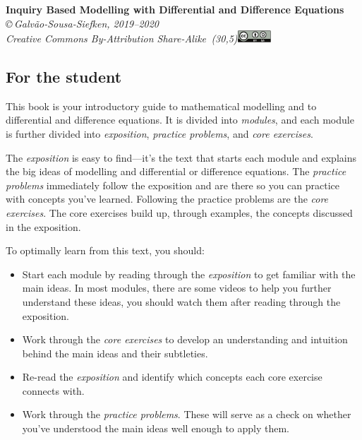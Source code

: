 \begin{center}
{\huge\bf Inquiry Based Modelling with Differential and Difference Equations}\\

\vspace{.7in}
{
\it \copyright\,Galv\~ao-Sousa-Siefken, 2019--2020 \\
Creative Commons By-Attribution Share-Alike\, \makebox(30,5){\includegraphics[height=1.2em]{by-sa.pdf}}
}
\end{center}


\subsection*{For the student}

This book is your introductory guide to mathematical modelling and to differential and difference equations. It is divided into
\emph{modules}, and each module is further divided into \emph{exposition},
\emph{practice problems}, and \emph{core exercises}.

The \emph{exposition} is easy to find---it's the text that starts each
module and explains the big ideas of modelling and differential or difference equations. The \emph{practice
problems} immediately follow the exposition and are there so you can
practice with concepts you've learned.  Following the practice problems
are the \emph{core exercises}. The core exercises build up, through
examples, the concepts discussed in the exposition.

To optimally learn from this text, you should:
\begin{itemize}
	\item Start each module by reading through the \emph{exposition} to get familiar with the main ideas. In most modules, there are some videos to help you further understand these ideas, you should watch them after reading through the exposition.

	\item Work through the \emph{core exercises} to develop an understanding and intuition behind the main ideas and their subtleties.

	\item Re-read the \emph{exposition} and identify which concepts each core exercise connects with.

	\item Work through the \emph{practice problems}. These will serve as a check on whether you've understood the main ideas well enough to apply them.
\end{itemize}

